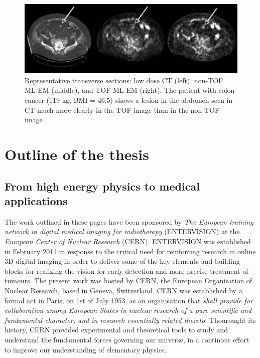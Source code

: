\begin{figure}  
\centering
\includegraphics[width=14cm]{Pictures/Chapter_1/tof_gain.pdf}
\caption[Improvement of TOF-PET]{Representative transverse sections: low dose CT (left), non-TOF ML-EM (middle), and TOF ML-EM (right). The patient with colon cancer (119 kg, BMI = 46.5) shows a lesion in the abdomen seen in CT much more clearly in the TOF image than in the non-TOF image \cite{Karp2008}.}
\label{fig:tofgain}
\end{figure}

\section{Outline of the thesis}

\subsection{From high energy physics to medical applications}
The work outlined in these pages have been sponsored by \textit{The European training network in digital medical imaging for radiotherapy} (ENTERVISION) at the \textit{European Center of Nuclear Research} (CERN). ENTERVISION was established in February 2011 in response to the critical need for reinforcing research in online 3D digital imaging in order to deliver some of the key elements and building blocks for realizing the vision for early detection and more precise treatment of tumours.
The present work was hosted by CERN, the European Organisation of Nuclear Research, based in Geneva, Switzerland. 
CERN was established by a formal act in Paris, on 1st of July 1953, as an organisation that \textit{shall provide for collaboration among European States in nuclear research of a pure scientific and fundamental character, and in research essentially related thereto}.
Thourought its history, CERN provided experimental and theoretical tools to study and understand the fundamental forces governing our universe, in a continous effort to improve our understanding of elementary  physics. 

